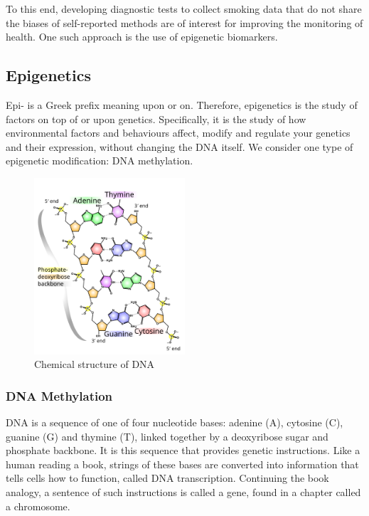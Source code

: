 \documentclass{article}
\begin{document}
To this end, developing diagnostic tests to collect smoking data that do not share the biases of self-reported methods are of interest for improving the monitoring of health. One such approach is the use of epigenetic biomarkers.

\subsection{Epigenetics}
Epi- is a Greek prefix meaning upon or on. Therefore, epigenetics is the study of factors on top of or upon genetics. Specifically, it is the study of how environmental factors and behaviours affect, modify and regulate your genetics and their expression, without changing the DNA itself. We consider one type of epigenetic modification: DNA methylation.

\begin{figure}
    \centering
    \includegraphics[width=0.5\textwidth]{512px-DNA_chemical_structure.svg.png}
    \caption*{Chemical structure of DNA \cite{ball_DNA_structure}}
\end{figure}

\subsubsection{DNA Methylation}
DNA is a sequence of one of four nucleotide bases: adenine (A), cytosine (C), guanine (G) and thymine (T), linked together by a deoxyribose sugar and phosphate backbone. It is this sequence that provides genetic instructions. Like a human reading a book, strings of these bases are converted into information that tells cells how to function, called DNA transcription. Continuing the book analogy, a sentence of such instructions is called a gene, found in a chapter called a chromosome. 
\end{document}
